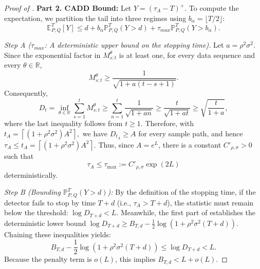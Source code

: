 \documentclass[12pt]{article}
\theoremstyle{spaced}
\theoremstyle{remark}
\begin{document}
\begin{proof}[Proof of ]
\textbf{Part 2. CADD Bound:}
Let $Y = (\tau_A - T)^+$. To compute the expectation, we partition the tail into three regimes using $b_\alpha = \lfloor T/2 \rfloor$:
\begin{equation} \label{eq:expectation_split}
    \mathbb{E}^T_{P,Q}[Y] \le d + b_\alpha \mathbb{P}^T_{P,Q}(Y > d) + \tau_{max} \mathbb{P}^T_{P,Q}(Y > b_\alpha).
\end{equation}

\textit{Step A ($\tau_{max}$: A deterministic upper bound on the stopping time).}
Let \(a=\rho^2\sigma^2\). Since the exponential factor in
\(M^\theta_{s:t}\) is at least one, for every data sequence and every
\(\theta\in\mathbb R\),
\[
M^\theta_{s:t}
\ge
\frac{1}{\sqrt{1+a(t-s+1)}}.
\]
Consequently,
\[
D_t
=
\inf_{\theta\in\mathbb R}\sum_{s=1}^tM^\theta_{s:t}
\ge
\sum_{n=1}^t\frac{1}{\sqrt{1+an}}
\ge
\frac{t}{\sqrt{1+at}}
\ge
\sqrt{\frac{t}{1+a}},
\]
where the last inequality follows from \(t\ge1\). Therefore, with
$t_A=\left\lceil(1+\rho^2\sigma^2)A^2\right\rceil,$
we have \(D_{t_A}\ge A\) for every sample path, and hence
$\tau_A\le t_A=
\left\lceil(1+\rho^2\sigma^2)A^2\right\rceil.$
Thus, since \(A=e^L\), there is a constant
\(C'_{\rho,\sigma}>0\) such that
\[
\tau_A\le \tau_{\max}:=C'_{\rho,\sigma}\exp{(2L)}
\]
deterministically.

\textit{Step B (Bounding $\mathbb{P}^T_{P,Q}(Y > d)$):} 
By the definition of the stopping time, if the detector fails to stop by time $T+d$ (i.e., $\tau_A > T+d$), the statistic must remain below the threshold: $\log D_{T+d} < L$. 
Meanwhile, the first part of  establishes the deterministic lower bound $\log D_{T+d} \ge B_{T,d} - \frac{1}{2}\log(1+\rho^2\sigma^2(T+d))$. Chaining these inequalities yields:
\[
    B_{T,d} - \frac{1}{2}\log(1+\rho^2\sigma^2(T+d)) \le \log D_{T+d} < L.
\]
Because the penalty term is $o(L)$, this implies $B_{T,d} < L + o(L)$.


\end{proof}
\end{document}
